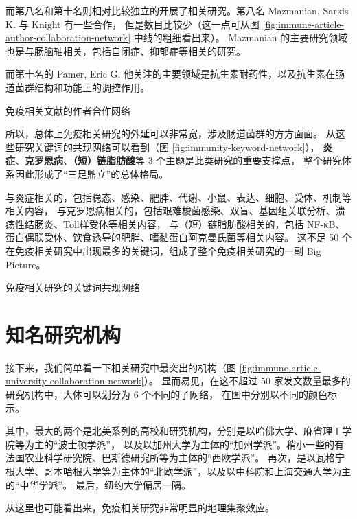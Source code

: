 \documentclass[]{ctexbook}
\begin{document}
而第八名和第十名则相对比较独立的开展了相关研究。第八名 Mazmanian, Sarkis K. 与 Knight 有一些合作，
但是数目比较少（这一点可从图 \ref{fig:immune-article-author-collaboration-network} 中线的粗细看出来）。
Mazmanian 的主要研究领域也是与肠脑轴相关，包括自闭症、抑郁症等相关的研究。

而第十名的 Pamer, Eric G. 他关注的主要领域是抗生素耐药性，以及抗生素在肠道菌群结构和功能上的调控作用。

\hypertarget{htmlwidget-669067825b4405370034}{}

\label{fig:immune-article-author-collaboration-network}免疫相关文献的作者合作网络

所以，总体上免疫相关研究的外延可以非常宽，涉及肠道菌群的方方面面。
从这些研究关键词的共现网络可以看到（图 \ref{fig:immunity-keyword-network}），
\textbf{炎症}、\textbf{克罗恩病}、\textbf{（短）链脂肪酸}等 3 个主题是此类研究的重要支撑点，
整个研究体系因此形成了``三足鼎立''的总体格局。

与炎症相关的，包括稳态、感染、肥胖、代谢、小鼠、表达、细胞、受体、机制等相关内容，
与克罗恩病相关的，包括艰难梭菌感染、双盲、基因组关联分析、溃疡性结肠炎、Toll样受体等相关内容，
与（短）链脂肪酸相关的，包括 NF-κB、蛋白偶联受体、饮食诱导的肥胖、嗜黏蛋白阿克曼氏菌等相关内容。
这不足 50 个在免疫相关研究中出现最多的关键词，组成了整个免疫相关研究的一副 Big Picture。

\hypertarget{htmlwidget-941130cd9fcced91e268}{}

\label{fig:immunity-keyword-network}免疫相关研究的关键词共现网络

\hypertarget{ux77e5ux540dux7814ux7a76ux673aux6784}{%
\section{知名研究机构}\label{ux77e5ux540dux7814ux7a76ux673aux6784}}

接下来，我们简单看一下相关研究中最突出的机构（图 \ref{fig:immune-article-university-collaboration-network}）。
显而易见，在这不超过 50 家发文数量最多的研究机构中，大体可以划分为 6 个不同的子网络，
在图中分别以不同的颜色标示。

其中，最大的两个是北美系列的高校和研究机构，分别是以哈佛大学、麻省理工学院等为主的``波士顿学派''，
以及以加州大学为主体的``加州学派''。稍小一些的有法国农业科学研究院、巴斯德研究所等为主体的``西欧学派''。
再次，是以瓦格宁根大学、哥本哈根大学等为主体的``北欧学派''，以及以中科院和上海交通大学为主的``中华学派''。
最后，纽约大学偏居一隅。

从这里也可能看出来，免疫相关研究非常明显的地理集聚效应。
\end{document}

